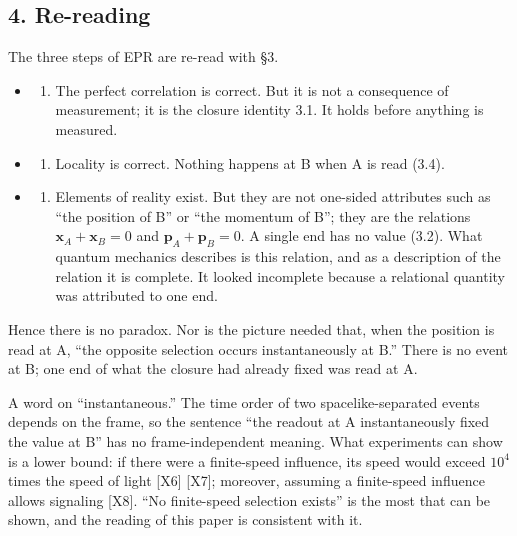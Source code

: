 \documentclass[
  a4paper,
]{article}
\providecommand{\tightlist}{%
  \setlength{\itemsep}{0pt}\setlength{\parskip}{0pt}}
\begin{document}
\subsection{4. Re-reading}\label{re-reading}

The three steps of EPR are re-read with §3.

\begin{itemize}
\tightlist
\item
  \begin{enumerate}
  \def\labelenumi{(\roman{enumi})}
  \tightlist
  \item
    The perfect correlation is correct. But it is not a consequence of
    measurement; it is the closure identity 3.1. It holds before
    anything is measured.
  \end{enumerate}
\item
  \begin{enumerate}
  \def\labelenumi{(\roman{enumi})}
  \setcounter{enumi}{1}
  \tightlist
  \item
    Locality is correct. Nothing happens at B when A is read (3.4).
  \end{enumerate}
\item
  \begin{enumerate}
  \def\labelenumi{(\roman{enumi})}
  \setcounter{enumi}{2}
  \tightlist
  \item
    Elements of reality exist. But they are not one-sided attributes
    such as ``the position of B'' or ``the momentum of B''; they are the
    relations \(\boldsymbol{x}_A+\boldsymbol{x}_B=0\) and
    \(\boldsymbol{p}_A+\boldsymbol{p}_B=0\). A single end has no value
    (3.2). What quantum mechanics describes is this relation, and as a
    description of the relation it is complete. It looked incomplete
    because a relational quantity was attributed to one end.
  \end{enumerate}
\end{itemize}

Hence there is no paradox. Nor is the picture needed that, when the
position is read at A, ``the opposite selection occurs instantaneously
at B.'' There is no event at B; one end of what the closure had already
fixed was read at A.

A word on ``instantaneous.'' The time order of two spacelike-separated
events depends on the frame, so the sentence ``the readout at A
instantaneously fixed the value at B'' has no frame-independent meaning.
What experiments can show is a lower bound: if there were a finite-speed
influence, its speed would exceed \(10^4\) times the speed of light
{[}X6{]} {[}X7{]}; moreover, assuming a finite-speed influence allows
signaling {[}X8{]}. ``No finite-speed selection exists'' is the most
that can be shown, and the reading of this paper is consistent with it.
\end{document}
